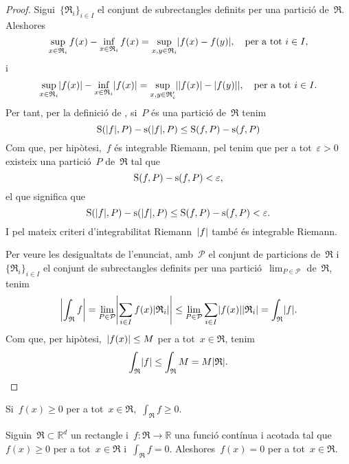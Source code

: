 \documentclass[../../main.tex]{subfiles}
\begin{document}
    \begin{proof}
        Sigui~\(\{\mathfrak{R}_{i}\}_{i\in I}\) el conjunt de subrectangles definits per una partició de~\(\mathfrak{R}\).
        Aleshores
        \[
            \sup_{x\in \mathfrak{R}_{i}}f(x)-\inf_{x\in \mathfrak{R}_{i}}f(x)=\sup_{x,y\in \mathfrak{R}_{i}}\abs{f(x)-f(y)},\quad\text{per a tot }i\in I,
        \]
        i
        \[
            \sup_{x\in \mathfrak{R}_{i}}\abs{f(x)}-\inf_{x\in \mathfrak{R}_{i}}\abs{f(x)}=\sup_{x,y\in \mathfrak{R}'_{i}}\abs{\abs{f(x)}-\abs{f(y)}},\quad\text{per a tot }i\in I.
        \]
        Per tant, per la definició de , si~\(P\) és una partició de~\(\mathfrak{R}\) tenim
        \[
            \Ssup(\abs{f},P)-\sinf(\abs{f},P)\leq\Ssup(f,P)-\sinf(f,P)
        \]
        Com que, per hipòtesi,~\(f\) és integrable Riemann, pel  tenim que per a tot~\(\varepsilon>0\) existeix una partició~\(P\) de~\(\mathfrak{R}\) tal que
        \[
            \operatorname{S}(f,P)-\operatorname{s}(f,P)<\varepsilon,
        \]
        el que significa que
        \[
            \Ssup(\abs{f},P)-\sinf(\abs{f},P)\leq\Ssup(f,P)-\sinf(f,P)<\varepsilon.
        \]
        I pel mateix criteri d'integrabilitat Riemann~\(\abs{f}\) també és integrable Riemann.

        Per veure les desigualtats de l'enunciat, amb~\(\mathcal{P}\) el conjunt de particions de~\(\mathfrak{R}\) i~\(\{\mathfrak{R}_{i}\}_{i\in I}\) el conjunt de subrectangles definits per una partició~\(\lim_{P\in\mathcal{P}}\) de~\(\mathfrak{R}\), tenim
        \[
            \abs{\int_{\mathfrak{R}}f}=\lim_{P\in\mathcal{P}}\abs{\sum_{i\in I}f(x)\abs{\mathfrak{R}_{i}}}\leq\lim_{P\in\mathcal{P}}\sum_{i\in I}\abs{f(x)}\abs{\mathfrak{R}_{i}}=\int_{\mathfrak{R}}\abs{f}.
        \]
        Com que, per hipòtesi,~\(\abs{f(x)}\leq M\) per a tot~\(x\in \mathfrak{R}\), tenim
        \[
            \int_{\mathfrak{R}}\abs{f}\leq\int_{\mathfrak{R}}M=M\abs{\mathfrak{R}}.\qedhere
        \]
    \end{proof}
    \begin{corollary}
        Si~\(f(x)\geq0\) per a tot~\(x\in \mathfrak{R}\),~\(\int_{\mathfrak{R}}f\geq0\).
    \end{corollary}
    \begin{proposition}
        Siguin~\(\mathfrak{R}\subset\mathbb{R}^{d}\) un rectangle i~\(f\colon\mathfrak{R}\to\mathbb{R}\) una funció contínua i acotada tal que~\(f(x)\geq0\) per a tot~\(x\in \mathfrak{R}\) i~\(\int_{\mathfrak{R}}f=0\).
        Aleshores~\(f(x)=0\) per a tot~\(x\in \mathfrak{R}\).
    \end{proposition}
\end{document}
